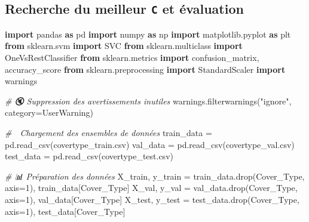 \documentclass[
  letterpaper,
  DIV=11,
  numbers=noendperiod]{scrartcl}
\newenvironment{Shaded}{}{}
\newcommand{\CommentTok}[1]{\textcolor[rgb]{0.38,0.63,0.69}{\textit{#1}}}
\newcommand{\DecValTok}[1]{\textcolor[rgb]{0.25,0.63,0.44}{#1}}
\newcommand{\ImportTok}[1]{\textcolor[rgb]{0.00,0.50,0.00}{\textbf{#1}}}
\newcommand{\NormalTok}[1]{#1}
\newcommand{\OperatorTok}[1]{\textcolor[rgb]{0.40,0.40,0.40}{#1}}
\newcommand{\PreprocessorTok}[1]{\textcolor[rgb]{0.74,0.48,0.00}{#1}}
\newcommand{\StringTok}[1]{\textcolor[rgb]{0.25,0.44,0.63}{#1}}
\begin{document}
\subsection{\texorpdfstring{Recherche du meilleur \texttt{C} et
évaluation}{Recherche du meilleur C et évaluation}}\label{recherche-du-meilleur-c-et-uxe9valuation}

\begin{Shaded}
\begin{Highlighting}[]
\ImportTok{import}\NormalTok{ pandas }\ImportTok{as}\NormalTok{ pd}
\ImportTok{import}\NormalTok{ numpy }\ImportTok{as}\NormalTok{ np}
\ImportTok{import}\NormalTok{ matplotlib.pyplot }\ImportTok{as}\NormalTok{ plt}
\ImportTok{from}\NormalTok{ sklearn.svm }\ImportTok{import}\NormalTok{ SVC}
\ImportTok{from}\NormalTok{ sklearn.multiclass }\ImportTok{import}\NormalTok{ OneVsRestClassifier}
\ImportTok{from}\NormalTok{ sklearn.metrics }\ImportTok{import}\NormalTok{ confusion\_matrix, accuracy\_score}
\ImportTok{from}\NormalTok{ sklearn.preprocessing }\ImportTok{import}\NormalTok{ StandardScaler}
\ImportTok{import}\NormalTok{ warnings}

\CommentTok{\# 🔇 Suppression des avertissements inutiles}
\NormalTok{warnings.filterwarnings(}\StringTok{"ignore"}\NormalTok{, category}\OperatorTok{=}\PreprocessorTok{UserWarning}\NormalTok{)}

\CommentTok{\# 🔄 Chargement des ensembles de données}
\NormalTok{train\_data }\OperatorTok{=}\NormalTok{ pd.read\_csv(}\StringTok{\textquotesingle{}covertype\_train.csv\textquotesingle{}}\NormalTok{)}
\NormalTok{val\_data }\OperatorTok{=}\NormalTok{ pd.read\_csv(}\StringTok{\textquotesingle{}covertype\_val.csv\textquotesingle{}}\NormalTok{)}
\NormalTok{test\_data }\OperatorTok{=}\NormalTok{ pd.read\_csv(}\StringTok{\textquotesingle{}covertype\_test.csv\textquotesingle{}}\NormalTok{)}

\CommentTok{\# 📊 Préparation des données}
\NormalTok{X\_train, y\_train }\OperatorTok{=}\NormalTok{ train\_data.drop(}\StringTok{\textquotesingle{}Cover\_Type\textquotesingle{}}\NormalTok{, axis}\OperatorTok{=}\DecValTok{1}\NormalTok{), train\_data[}\StringTok{\textquotesingle{}Cover\_Type\textquotesingle{}}\NormalTok{]}
\NormalTok{X\_val, y\_val }\OperatorTok{=}\NormalTok{ val\_data.drop(}\StringTok{\textquotesingle{}Cover\_Type\textquotesingle{}}\NormalTok{, axis}\OperatorTok{=}\DecValTok{1}\NormalTok{), val\_data[}\StringTok{\textquotesingle{}Cover\_Type\textquotesingle{}}\NormalTok{]}
\NormalTok{X\_test, y\_test }\OperatorTok{=}\NormalTok{ test\_data.drop(}\StringTok{\textquotesingle{}Cover\_Type\textquotesingle{}}\NormalTok{, axis}\OperatorTok{=}\DecValTok{1}\NormalTok{), test\_data[}\StringTok{\textquotesingle{}Cover\_Type\textquotesingle{}}\NormalTok{]}


\end{Highlighting}
\end{Shaded}
\end{document}
